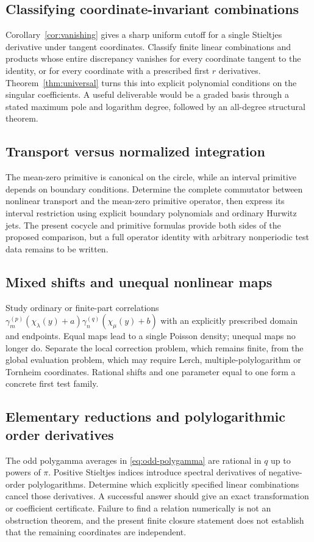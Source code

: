 \documentclass[11pt]{article}
\theoremstyle{definition}\newtheorem{definition}[theorem]{Definition}
\theoremstyle{remark}\newtheorem{remark}[theorem]{Remark}
\begin{document}
\subsection{Classifying coordinate-invariant combinations}
Corollary~\ref{cor:vanishing} gives a sharp uniform cutoff for a single Stieltjes derivative under tangent coordinates. Classify finite linear combinations and products whose entire discrepancy vanishes for every coordinate tangent to the identity, or for every coordinate with a prescribed first $r$ derivatives. Theorem~\ref{thm:universal} turns this into explicit polynomial conditions on the singular coefficients. A useful deliverable would be a graded basis through a stated maximum pole and logarithm degree, followed by an all-degree structural theorem.

\subsection{Transport versus normalized integration}
The mean-zero primitive is canonical on the circle, while an interval primitive depends on boundary conditions. Determine the complete commutator between nonlinear transport and the mean-zero primitive operator, then express its interval restriction using explicit boundary polynomials and ordinary Hurwitz jets. The present cocycle and primitive formulas provide both sides of the proposed comparison, but a full operator identity with arbitrary nonperiodic test data remains to be written.

\subsection{Mixed shifts and unequal nonlinear maps}
Study ordinary or finite-part correlations
$\gamma_m^{(p)}(\chi_\lambda(y)+a)\gamma_n^{(q)}(\chi_\mu(y)+b)$
with an explicitly prescribed domain and endpoints. Equal maps lead to a single Poisson density; unequal maps no longer do. Separate the local correction problem, which remains finite, from the global evaluation problem, which may require Lerch, multiple-polylogarithm or Tornheim coordinates. Rational shifts and one parameter equal to one form a concrete first test family.

\subsection{Elementary reductions and polylogarithmic order derivatives}
The odd polygamma averages in \eqref{eq:odd-polygamma} are rational in $q$ up to powers of $\pi$. Positive Stieltjes indices introduce spectral derivatives of negative-order polylogarithms. Determine which explicitly specified linear combinations cancel those derivatives. A successful answer should give an exact transformation or coefficient certificate. Failure to find a relation numerically is not an obstruction theorem, and the present finite closure statement does not establish that the remaining coordinates are independent.
\end{document}
